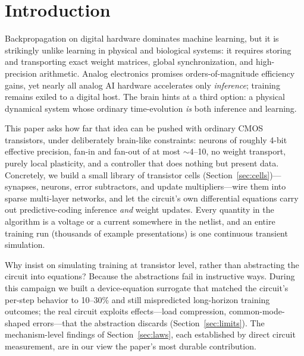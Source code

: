 \documentclass[11pt]{article}
\begin{document}
\begin{abstract}
system's chief vulnerability: static transistor mismatch of $\sigma=2\,$mV degrades the depth-4 result from 0.84 to 0.46, a first-class negative result that sets the agenda for offset-canceling cell design. We distill the campaign into measured design laws for physical learning machines.
\end{abstract}

\section{Introduction}

Backpropagation on digital hardware dominates machine learning, but it is strikingly unlike learning in physical and biological systems: it requires storing and transporting exact weight matrices, global synchronization, and high-precision arithmetic. Analog electronics promises orders-of-magnitude efficiency gains, yet nearly all analog AI hardware accelerates only \emph{inference}; training remains exiled to a digital host. The brain hints at a third option: a physical dynamical system whose ordinary time-evolution \emph{is} both inference and learning.

This paper asks how far that idea can be pushed with ordinary CMOS transistors, under deliberately brain-like constraints: neurons of roughly 4-bit effective precision, fan-in and fan-out of at most $\sim$4--10, no weight transport, purely local plasticity, and a controller that does nothing but present data. Concretely, we build a small library of transistor cells (Section~\ref{sec:cells})---synapses, neurons, error subtractors, and update multipliers---wire them into sparse multi-layer networks, and let the circuit's own differential equations carry out predictive-coding inference \emph{and} weight updates. Every quantity in the algorithm is a voltage or a current somewhere in the netlist, and an entire training run (thousands of example presentations) is one continuous transient simulation.

Why insist on simulating training at transistor level, rather than abstracting the circuit into equations? Because the abstractions fail in instructive ways. During this campaign we built a device-equation surrogate that matched the circuit's per-step behavior to 10--30\% and still mispredicted long-horizon training outcomes; the real circuit exploits effects---load compression, common-mode-shaped errors---that the abstraction discards (Section~\ref{sec:limits}). The mechanism-level findings of Section~\ref{sec:laws}, each established by direct circuit measurement, are in our view the paper's most durable contribution.
\end{document}
